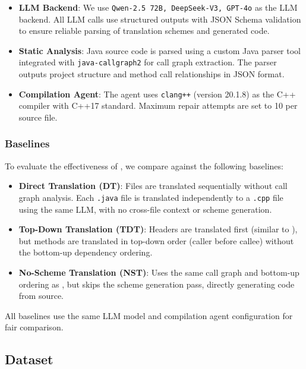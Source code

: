 \begin{itemize}
\item \textbf{LLM Backend}: We use \texttt{Qwen-2.5 72B, DeepSeek-V3, GPT-4o} as the LLM backend. All LLM calls use structured outputs with JSON Schema validation to ensure reliable parsing of translation schemes and generated code.

\item \textbf{Static Analysis}: Java source code is parsed using a custom Java parser tool integrated with \texttt{java-callgraph2} for call graph extraction. The parser outputs project structure and method call relationships in JSON format.

\item \textbf{Compilation Agent}: The agent uses \texttt{clang++} (version 20.1.8) as the C++ compiler with C++17 standard. Maximum repair attempts are set to 10 per source file.
\end{itemize}

\subsubsection{Baselines}

To evaluate the effectiveness of \tool{}, we compare against the following baselines:

\begin{itemize}
\item \textbf{Direct Translation (DT)}: Files are translated sequentially without call graph analysis. Each \texttt{.java} file is translated independently to a \texttt{.cpp} file using the same LLM, with no cross-file context or scheme generation.

\item \textbf{Top-Down Translation (TDT)}: Headers are translated first (similar to \tool{}), but methods are translated in top-down order (caller before callee) without the bottom-up dependency ordering.

\item \textbf{No-Scheme Translation (NST)}: Uses the same call graph and bottom-up ordering as \tool{}, but skips the scheme generation pass, directly generating code from source.
\end{itemize}

All baselines use the same LLM model and compilation agent configuration for fair comparison.

\subsection{Dataset}

